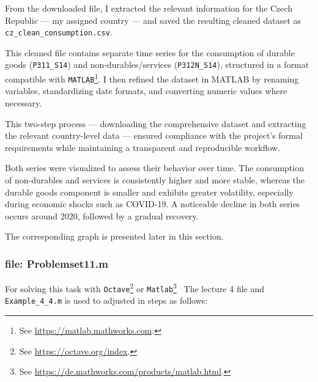 \documentclass[12pt,a4paper,notitlepage]{article}
\numberwithin{equation}{section}
\begin{document}
From the downloaded file, I extracted the relevant information for the Czech Republic — my assigned country — and saved the resulting cleaned dataset as \\ \texttt{cz\_clean\_consumption.csv}.


This cleaned file contains separate time series for the consumption of durable goods (\texttt{P311\_S14}) and non-durables/services (\texttt{P312N\_S14}), structured in a format compatible with \texttt{MATLAB}\footnote{See \url{https://matlab.mathworks.com}.}. I then refined the dataset in MATLAB by renaming variables, standardizing date formats, and converting numeric values where necessary.

This two-step process — downloading the comprehensive dataset and extracting the relevant country-level data — ensured compliance with the project's formal requirements while maintaining a transparent and reproducible workflow.

Both series were visualized to assess their behavior over time. The consumption of non-durables and services is consistently higher and more stable, whereas the durable goods component is smaller and exhibits greater volatility, especially during economic shocks such as COVID-19. A noticeable decline in both series occurs around 2020, followed by a gradual recovery.

The corresponding graph is presented later in this section.

\subsubsection{   file: Problemset11.m}
For solving this task with \texttt{Octave}\footnote{See \url {https://octave.org/index}.} or \texttt{Matlab}\footnote{See \url{https://de.mathworks.com/products/matlab.html}.} \ The  lecture 4 file and \texttt{ Example\_4\_4.m} is used to adjusted in steps as follows: 
\end{document}
